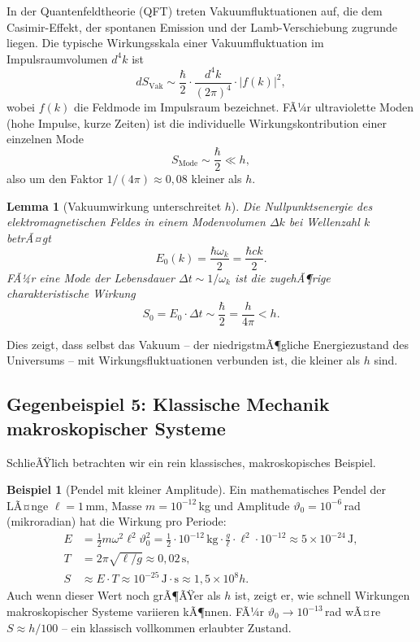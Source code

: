 ﻿\documentclass[12pt,a4paper]{article}
\theoremstyle{plain}
\newtheorem{lemma}{Lemma}[section]
\theoremstyle{definition}
\newtheorem{example}{Beispiel}[section]
\theoremstyle{remark}
\begin{document}
In der Quantenfeldtheorie (QFT) treten Vakuumfluktuationen auf, die dem Casimir-Effekt,
der spontanen Emission und der Lamb-Verschiebung zugrunde liegen. Die typische Wirkungsskala
einer Vakuumfluktuation im Impulsraumvolumen $d^4k$ ist
\begin{equation}
  dS_{\mathrm{Vak}} \sim \frac{\hbar}{2} \cdot \frac{d^4k}{(2\pi)^4} \cdot |f(k)|^2,
\end{equation}
wobei $f(k)$ die Feldmode im Impulsraum bezeichnet. FÃ¼r ultraviolette Moden (hohe
Impulse, kurze Zeiten) ist die individuelle Wirkungskontribution einer einzelnen Mode
\begin{equation}
  S_{\mathrm{Mode}} \sim \frac{\hbar}{2} \ll h,
\end{equation}
also um den Faktor $1/(4\pi) \approx 0{,}08$ kleiner als $h$.

\begin{lemma}[Vakuumwirkung unterschreitet $h$]\label{lem:vakuum}
  Die Nullpunktsenergie des elektromagnetischen Feldes in einem Modenvolumen $\Delta k$
  bei Wellenzahl $k$ betrÃ¤gt
  \begin{equation}
    E_0(k) = \frac{\hbar\omega_k}{2} = \frac{\hbar c k}{2}.
  \end{equation}
  FÃ¼r eine Mode der Lebensdauer $\Delta t \sim 1/\omega_k$ ist die zugehÃ¶rige
  charakteristische Wirkung
  \begin{equation}
    S_0 = E_0 \cdot \Delta t \sim \frac{\hbar}{2} = \frac{h}{4\pi} < h.
  \end{equation}
\end{lemma}

Dies zeigt, dass selbst das Vakuum -- der niedrigstmÃ¶gliche Energiezustand des
Universums -- mit Wirkungsfluktuationen verbunden ist, die kleiner als $h$ sind.

\subsection{Gegenbeispiel 5: Klassische Mechanik makroskopischer Systeme}

SchlieÃŸlich betrachten wir ein rein klassisches, makroskopisches Beispiel.

\begin{example}[Pendel mit kleiner Amplitude]\label{ex:pendel}
  Ein mathematisches Pendel der LÃ¤nge $\ell = 1$\,mm, Masse $m = 10^{-12}$\,kg und
  Amplitude $\vartheta_0 = 10^{-6}$\,rad (mikroradian) hat die Wirkung pro Periode:
  \begin{align}
    E &= \frac{1}{2}m\omega^2 \ell^2 \vartheta_0^2
       = \frac{1}{2}\cdot 10^{-12}\,\text{kg}\cdot \frac{g}{\ell}\cdot \ell^2\cdot 10^{-12}
       \approx 5\times 10^{-24}\,\text{J},\\
    T &= 2\pi\sqrt{\ell/g} \approx 0{,}02\,\text{s},\\
    S &\approx E \cdot T \approx 10^{-25}\,\mathrm{J{\cdot}s} \approx 1{,}5\times 10^{8} h.
  \end{align}
  Auch wenn dieser Wert noch grÃ¶ÃŸer als $h$ ist, zeigt er, wie schnell Wirkungen
  makroskopischer Systeme variieren kÃ¶nnen. FÃ¼r $\vartheta_0 \to 10^{-13}$\,rad wÃ¤re
  $S \approx h/100$ -- ein klassisch vollkommen erlaubter Zustand.
\end{example}
\end{document}
